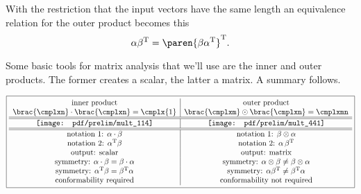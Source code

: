 With the restriction that the input vectors have the same length an equivalence relation for the outer product becomes this
\begin{equation}
  \alpha \beta^{\mathrm{T}} = \paren{\beta \alpha^{\mathrm{T}}}^{\mathrm{T}}.
\end{equation}

Some basic tools for matrix analysis that we'll use are the inner and outer products. The former creates a scalar, the latter a matrix. A summary follows.

$$
\boxed{
\begin{array}{c|c}
\text{inner product}  & \text{outer product}\\
\text{$\brac{\cmplxn} \cdot \brac{\cmplxn} = \cmplx{1}$}  & \text{$\brac{\cmplxm} \odot \brac{\cmplxn} = \cmplxmn$}\\\hline\hline
%
\texttt{[image: pdf/prelim/mult\_114]}&
\texttt{[image: pdf/prelim/mult\_441]}\\\hline\hline
%
\text{notation 1: } \alpha \cdot \beta & \text{notation 1: } \beta \otimes \alpha\\
\text{notation 2: }\alpha^{\mathrm{T}}\beta & \text{notation 2: } \alpha\,\beta^{\mathrm{T}} \\
%
\text{output: scalar} & \text{output: matrix}\\
%
\text{symmetry: } \alpha \cdot \beta = \beta \cdot \alpha & \text{symmetry: } \alpha \otimes \beta \ne \beta \otimes \alpha\\
\text{symmetry: } \alpha^{\mathrm{T}} \beta = \beta^{\mathrm{T}} \alpha & \text{symmetry: } \alpha \beta^{\mathrm{T}} \ne \beta^{\mathrm{T}} \alpha\\
%
\text{conformability required} & \text{conformability not required}\\
\end{array}
}
$$

\endinput